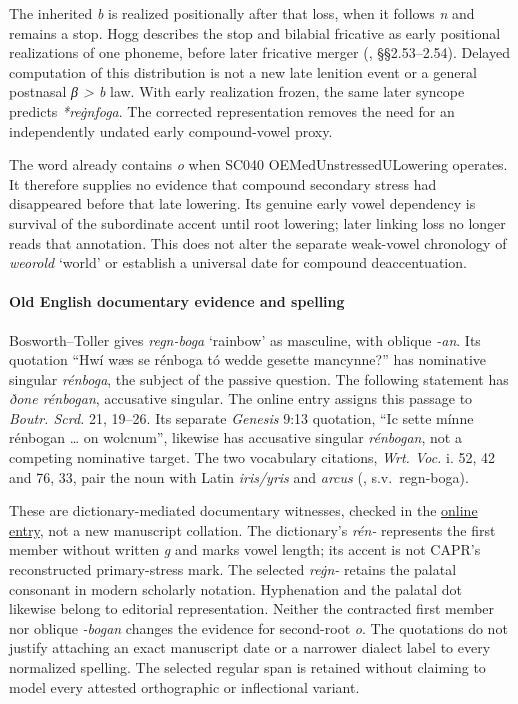 \documentclass[
  british,
  a4paper,
]{article}
\begin{document}
The inherited \emph{b} is realized positionally after that loss, when it
follows \emph{n} and remains a stop. Hogg describes the stop and
bilabial fricative as early positional realizations of one phoneme,
before later fricative merger (, §§2.53--2.54). Delayed computation of this distribution is not
a new late lenition event or a general postnasal \emph{β > b} law. With
early realization frozen, the same later syncope predicts
\emph{*reġnfoga}. The corrected representation removes the need for an
independently undated early compound-vowel proxy.

The word already contains \emph{o} when SC040 OEMedUnstressedULowering
operates. It therefore supplies no evidence that compound secondary
stress had disappeared before that late lowering. Its genuine early
vowel dependency is survival of the subordinate accent until root
lowering; later linking loss no longer reads that annotation. This does
not alter the separate weak-vowel chronology of \emph{weorold} `world'
or establish a universal date for compound deaccentuation.

\paragraph{Old English documentary evidence and
spelling}\label{old-english-documentary-evidence-and-spelling}

Bosworth--Toller gives \emph{regn-boga} `rainbow' as masculine, with
oblique \emph{-an}. Its quotation ``Hwí wæs se rénboga tó wedde gesette
mancynne?'' has nominative singular {\emph{rénboga}}, the subject of the
passive question. The following statement has \emph{ðone rénbogan},
accusative singular. The online entry assigns this passage to
\emph{Boutr. Scrd.} 21, 19--26. Its separate \emph{Genesis} 9:13
quotation, ``Ic sette mínne rénbogan \ldots{} on wolcnum'', likewise has
accusative singular {\emph{rénbogan}}, not a competing nominative
target. The two vocabulary citations, \emph{Wrt. Voc.} i. 52, 42 and 76,
33, pair the noun with Latin \emph{iris/yris} and \emph{arcus}
(,
s.v.~regn-boga).

These are dictionary-mediated documentary witnesses, checked in the
\href{https://bosworthtoller.com/25654}{online entry}, not a new
manuscript collation. The dictionary's \emph{rén-} represents the first
member without written \emph{g} and marks vowel length; its accent is
not CAPR's reconstructed primary-stress mark. The selected \emph{reġn-}
retains the palatal consonant in modern scholarly notation. Hyphenation
and the palatal dot likewise belong to editorial representation. Neither
the contracted first member nor oblique \emph{-bogan} changes the
evidence for second-root \emph{o}. The quotations do not justify
attaching an exact manuscript date or a narrower dialect label to every
normalized spelling. The selected regular span is retained without
claiming to model every attested orthographic or inflectional variant.
\end{document}
